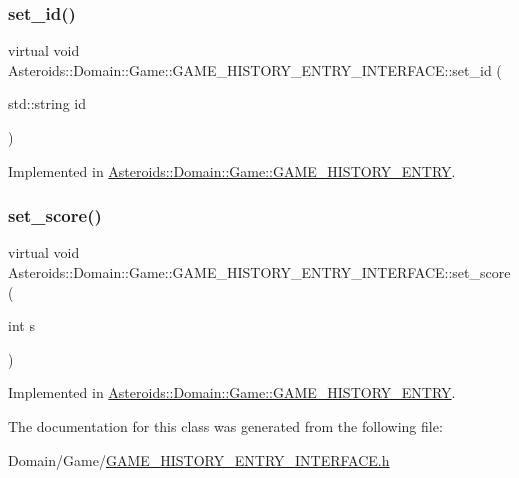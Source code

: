 \subsubsection{\texorpdfstring{set\+\_\+id()}{set\_id()}}
{\footnotesize\ttfamily virtual void Asteroids\+::\+Domain\+::\+Game\+::\+G\+A\+M\+E\+\_\+\+H\+I\+S\+T\+O\+R\+Y\+\_\+\+E\+N\+T\+R\+Y\+\_\+\+I\+N\+T\+E\+R\+F\+A\+C\+E\+::set\+\_\+id (\begin{DoxyParamCaption}\item[{std\+::string}]{id }\end{DoxyParamCaption})\hspace{0.3cm}{\ttfamily [pure virtual]}}



Implemented in \hyperlink{classAsteroids_1_1Domain_1_1Game_1_1GAME__HISTORY__ENTRY_a888db2c5c245eed8e4d43fef01ac08df}{Asteroids\+::\+Domain\+::\+Game\+::\+G\+A\+M\+E\+\_\+\+H\+I\+S\+T\+O\+R\+Y\+\_\+\+E\+N\+T\+RY}.

\mbox{\label{classAsteroids_1_1Domain_1_1Game_1_1GAME__HISTORY__ENTRY__INTERFACE_a23a1106062e67ef19d856f29ee8ade12}} 
\subsubsection{\texorpdfstring{set\+\_\+score()}{set\_score()}}
{\footnotesize\ttfamily virtual void Asteroids\+::\+Domain\+::\+Game\+::\+G\+A\+M\+E\+\_\+\+H\+I\+S\+T\+O\+R\+Y\+\_\+\+E\+N\+T\+R\+Y\+\_\+\+I\+N\+T\+E\+R\+F\+A\+C\+E\+::set\+\_\+score (\begin{DoxyParamCaption}\item[{int}]{s }\end{DoxyParamCaption})\hspace{0.3cm}{\ttfamily [pure virtual]}}



Implemented in \hyperlink{classAsteroids_1_1Domain_1_1Game_1_1GAME__HISTORY__ENTRY_a156c3017d2c591e7eaef0522a7e5249d}{Asteroids\+::\+Domain\+::\+Game\+::\+G\+A\+M\+E\+\_\+\+H\+I\+S\+T\+O\+R\+Y\+\_\+\+E\+N\+T\+RY}.



The documentation for this class was generated from the following file\+:\begin{DoxyCompactItemize}
\item 
Domain/\+Game/\hyperlink{GAME__HISTORY__ENTRY__INTERFACE_8h}{G\+A\+M\+E\+\_\+\+H\+I\+S\+T\+O\+R\+Y\+\_\+\+E\+N\+T\+R\+Y\+\_\+\+I\+N\+T\+E\+R\+F\+A\+C\+E.\+h}\end{DoxyCompactItemize}
